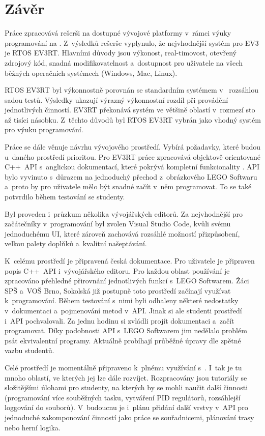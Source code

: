 \chapter{Závěr}

Práce zpracovává rešerši na dostupné vývojové platformy v~rámci výuky programování na \legoEV{}.
Z~výsledků rešerše vyplynulo, že nejvhodnější systém pro EV3 je RTOS EV3RT. 
Hlavními důvody jsou výkonost, real-timovost, otevřený zdrojový kód, snadná modifikovatelnost a~dostupnost pro uživatele na všech běžných operačních systémech (Windows, Mac, Linux).

RTOS EV3RT byl výkonnostně porovnán se standardním systémem v~ rozsáhlou sadou testů.
Výsledky ukazují výrazný výkonnostní rozdíl při provádění jednotlivých činností. 
EV3RT překonává \lego{} systém ve většině oblastí v~rozmezí sto až tisíci násobku.
Z~těchto důvodů byl RTOS EV3RT vybrán jako vhodný systém pro výuku programování. 

Práce se dále věnuje návrhu vývojového prostředí. 
Vybírá požadavky, které budou u~daného prostředí prioritou.
Pro EV3RT práce zpracovává objektově orientované C++~API s~anglickou dokumentací, které pokrývá kompletní funkcionality \legoEV{}. 
API bylo vyvinuto s~důrazem na jednoduchý přechod z~obrázkového LEGO Softwaru a~proto by pro uživatele mělo být snadné začít v~něm programovat.
To se také potvrdilo během testování se studenty.

Byl proveden i~průzkum několika vývojářských editorů. 
Za nejvhodnější pro začátečníky v~programování byl zvolen Visual Studio Code, kvůli svému jednoduchému UI, které zároveň zachovává rozsáhlé možností přizpůsobení, velkou palety doplňků a~kvalitní našeptávání. 

K~celému prostředí je připravená česká dokumentace. 
Pro uživatele je připraven popis C++~API i~vývojářského editoru. 
Pro každou oblast používání je zpracováno přehledné přirovnání jednotlivých funkcí s~LEGO Softwarem.
Žáci SPŠ a~VOŠ Brno, Sokolská již postupně toto prostředí začínají využívat k~programování.
Během testování s~nimi byli odhaleny některé nedostatky v~dokumentaci a~pojmenování metod v~API. 
Jinak si ale studenti prostředí i~API pochvalovali. 
Za jednu hodinu si zvládli projít dokumentaci a~začít programovat. 
Díky podobnosti API s~LEGO Softwarem jim nedělalo problém psát ekvivalentní programy.
Aktuálně probíhají průběžné úpravy dle zpětné vazbu studentů.

Celé prostředí je momentálně připraveno k~plnému využívání s~\legoEV{}. 
I~tak je tu mnoho oblastí, ve kterých jej lze dále rozvíjet. 
Rozpracovány jsou tutoriály se složitějšími úlohami pro studenty, na kterých by se mohli naučit další činnosti (programování více souběžných tasku, vytváření PID regulátorů, rozsáhlejší loggování do souborů).
V~budoucnu je i~plánu přidání další vrstvy v~API pro jednoduché zakomponování činností jako práce se souřadnicemi, plánování trasy nebo herní logika.
